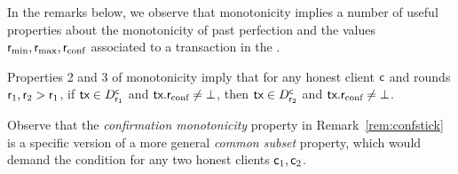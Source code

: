 In the remarks below, we observe that \podtm monotonicity implies a number of useful properties about the monotonicity of past perfection and the values $\textsf{r}_\text{min},\textsf{r}_\text{max},\textsf{r}_\text{conf}$ associated to a transaction in the \podtm.

\begin{remark}\label{rem:confstick}
	Properties 2 and 3 of \podtm monotonicity imply that  for any honest client $\textsf{c}$ and rounds $\textsf{r}_1, \textsf{r}_2 > \textsf{r}_1$,
	if $\textsf{tx} \in D_{\textsf{r}_1}^{\textsf{c}}$ and $\textsf{tx}.\textsf{r}_\text{conf} \neq \bot$, then $\textsf{tx} \in D_{\textsf{r}_2}^{\textsf{c}}$ and $\textsf{tx}.\textsf{r}_\text{conf} \neq \bot$.
\end{remark}



\begin{remark}
	Observe that the \emph{confirmation monotonicity} property in Remark~\ref{rem:confstick} is a specific version of a more general \emph{common subset} property, which would demand the condition for any two honest clients $\textsf{c}_1, \textsf{c}_2$.
\end{remark}